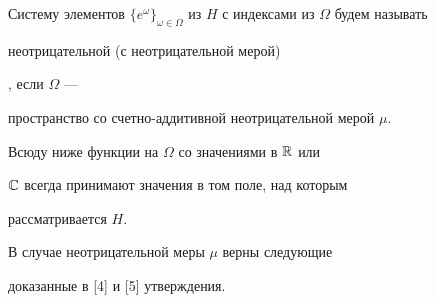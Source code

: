 \begin{defn}\hspace{-1.8mm}{\bf.}


Систему элементов $\{e^\omega\}_{\omega


\in\Omega}$ из $H$ с индексами из $\Omega$ будем называть {\it


неотрицательной (с неотрицательной мерой)}, если $\Omega$ ---


пространство со счетно-аддитивной неотрицательной мерой $\mu$.


\end{defn}





Всюду ниже функции на $\Omega$ со значениями в $\Bbb R$ или


$\Bbb C$ всегда принимают значения в том поле, над которым


рассматривается $H$.





В случае неотрицательной меры $\mu$ верны следующие


доказанные в [4] и [5] утверждения.






